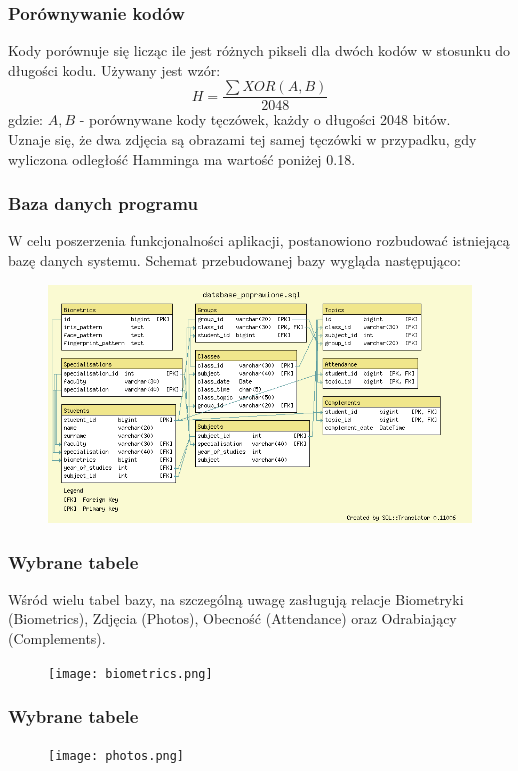 \documentclass{beamer}
\begin{document}

\begin{frame}
\frametitle{Porównywanie kodów}
Kody porównuje się licząc ile jest różnych pikseli dla dwóch kodów w stosunku do długości kodu. Używany jest wzór:
$$ H = \frac{\sum XOR(A,B)}{2048} $$
gdzie:
$A, B$ - porównywane kody tęczówek, każdy o długości 2048 bitów.\\

Uznaje się, że dwa zdjęcia są obrazami tej samej tęczówki w przypadku, gdy wyliczona odległość Hamminga ma wartość poniżej 0.18.
\end{frame}

\begin{frame}
\frametitle{Baza danych programu}
W celu poszerzenia funkcjonalności aplikacji, postanowiono rozbudować istniejącą bazę danych systemu. Schemat przebudowanej bazy wygląda następująco:

\begin{figure}
\includegraphics[scale=0.3]{diagram.png}
\end{figure}
\end{frame}

\begin{frame}
\frametitle{Wybrane tabele}

Wśród wielu tabel bazy, na szczególną uwagę zasługują relacje Biometryki (Biometrics), Zdjęcia (Photos), Obecność (Attendance) oraz Odrabiający (Complements).
\begin{figure}
\texttt{[image: biometrics.png]}
\end{figure}
\end{frame}

\begin{frame}
\frametitle{Wybrane tabele}

\begin{figure}
\texttt{[image: photos.png]}
\end{figure}
\end{frame}
\end{document}
